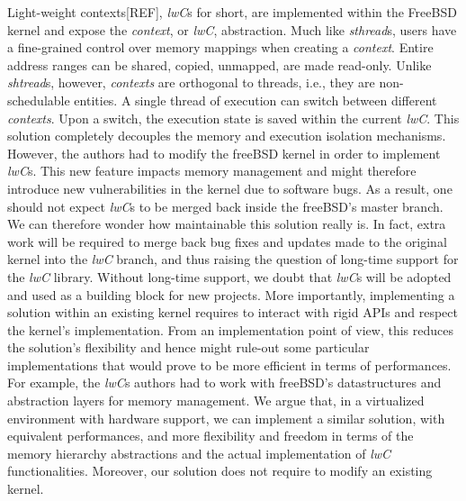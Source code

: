 \documentclass[letterpaper,twocolumn,10pt]{article}
\begin{document}
Light-weight contexts[REF], \emph{lwC}s for short, are implemented within the FreeBSD kernel and expose the \emph{context}, or \emph{lwC}, abstraction.
Much like \emph{sthread}s, users have a fine-grained control over memory mappings when creating a \emph{context}.
Entire address ranges can be shared, copied, unmapped, are made read-only.
Unlike \emph{shtread}s, however, \emph{contexts} are orthogonal to threads, i.e., they are non-schedulable entities.
A single thread of execution can switch between different \emph{contexts}.
Upon a switch, the execution state is saved within the current \emph{lwC}.
This solution completely decouples the memory and execution isolation mechanisms.
However, the authors had to modify the freeBSD kernel in order to implement \emph{lwC}s.
This new feature impacts memory management and might therefore introduce new vulnerabilities in the kernel due to software bugs.
As a result, one should not expect \emph{lwC}s to be merged back inside the freeBSD's master branch.
We can therefore wonder how maintainable this solution really is.
In fact, extra work will be required to merge back bug fixes and updates made to the original kernel into the \emph{lwC} branch, and thus raising the question of long-time support for the \emph{lwC} library.
Without long-time support, we doubt that \emph{lwC}s will be adopted and used as a building block for new projects.
More importantly, implementing a solution within an existing kernel requires to interact with rigid APIs and respect the kernel's implementation.
From an implementation point of view, this reduces the solution's flexibility and hence might rule-out some particular implementations that would prove to be more efficient in terms of performances.
For example, the \emph{lwC}s authors had to work with freeBSD's datastructures and abstraction layers for memory management.
We argue that, in a virtualized environment with hardware support, we can implement a similar solution, with equivalent performances, and more flexibility and freedom in terms of the memory hierarchy abstractions and the actual implementation of \emph{lwC} functionalities.
Moreover, our solution does not require to modify an existing kernel.
%
%
%
\end{document}
